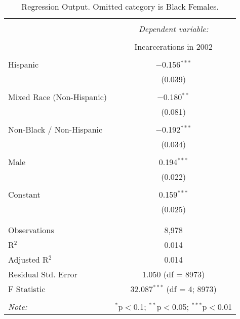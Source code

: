
\begin{table}[!htbp] \centering 
  \caption{Regression Output. Omitted category is Black Females.} 
  \label{tab:regression} 
\begin{tabular}{@{\extracolsep{5pt}}lc} 
\\[-1.8ex]\hline 
\hline \\[-1.8ex] 
 & \multicolumn{1}{c}{\textit{Dependent variable:}} \\ 
\cline{2-2} 
\\[-1.8ex] & Incarcerations in 2002 \\ 
\hline \\[-1.8ex] 
 Hispanic & $-$0.156$^{***}$ \\ 
  & (0.039) \\ 
  & \\ 
 Mixed Race (Non-Hispanic) & $-$0.180$^{**}$ \\ 
  & (0.081) \\ 
  & \\ 
 Non-Black / Non-Hispanic & $-$0.192$^{***}$ \\ 
  & (0.034) \\ 
  & \\ 
 Male & 0.194$^{***}$ \\ 
  & (0.022) \\ 
  & \\ 
 Constant & 0.159$^{***}$ \\ 
  & (0.025) \\ 
  & \\ 
\hline \\[-1.8ex] 
Observations & 8,978 \\ 
R$^{2}$ & 0.014 \\ 
Adjusted R$^{2}$ & 0.014 \\ 
Residual Std. Error & 1.050 (df = 8973) \\ 
F Statistic & 32.087$^{***}$ (df = 4; 8973) \\ 
\hline 
\hline \\[-1.8ex] 
\textit{Note:}  & \multicolumn{1}{r}{$^{*}$p$<$0.1; $^{**}$p$<$0.05; $^{***}$p$<$0.01} \\ 
\end{tabular} 
\end{table} 
